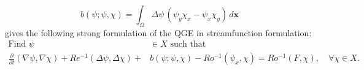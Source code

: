 \begin{equation}
  b(\psi; \psi, \chi) = \int_{\Omega}\! \Delta \psi\, (\psi_y \chi_x - \psi_x
  \chi_y)\, d\mathbf{x}
  \label{eqn:b}
\end{equation}
gives the following strong formulation of the QGE in streamfunction formulation:
\begin{equation}
  \begin{split}
    \text{Find } \psi &\in X \text{ such that} \\
    \frac{\partial}{\partial t} (\nabla \psi, \nabla \chi) + Re^{-1} (\Delta
      \psi, \Delta \chi) +& b(\psi;\psi,\chi) - Ro^{-1}(\psi_x,\chi)
      = Ro^{-1} (F,\chi),\quad \forall \chi \in X.
  \end{split}
  \label{eqn:QGEWF}
\end{equation}
